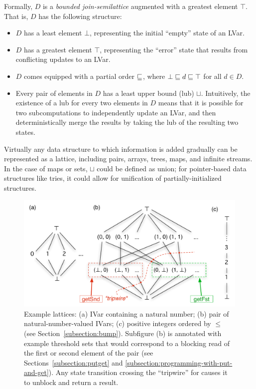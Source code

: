 Formally, $D$ is a \emph{bounded join-semilattice} augmented with a
greatest element $\top$.  That is, $D$ has the following structure:
\begin{itemize}
\item $D$ has a least element $\bot$, representing the initial
  ``empty'' state of an LVar.
\item $D$ has a greatest element $\top$, representing the ``error''
  state that results from conflicting updates to an LVar.
\item $D$ comes equipped with a partial order $\sqsubseteq$, where $\bot
  \sqsubseteq d \sqsubseteq \top$ for all $d \in D$.
\item Every pair of elements in $D$ has a least upper bound (lub)
  $\sqcup$.  Intuitively, the existence of a lub for every two
  elements in $D$ means that it is possible for two subcomputations to
  independently update an LVar, and then deterministically merge the
  results by taking the lub of the resulting two states.
\end{itemize}

\noindent Virtually any data structure to which information
is added gradually can be represented as a lattice, including pairs,
arrays, trees, maps, and infinite streams.  In the case of maps or
sets, $\sqcup$ could be defined as union; for pointer-based data
structures like tries, it could allow for unification of
partially-initialized structures.

\begin{figure}
\includegraphics[width=6in]{chapter2/figures/ExampleLattices2.pdf} 
  \caption{\footnotesize Example lattices: (a) IVar containing a
    natural number; (b) pair of natural-number-valued IVars; (c)
    positive integers ordered by $\leq$ (see
    Section~\ref{subsection:bump}).  Subfigure (b) is annotated with
    example threshold sets that would correspond to a blocking read of
    the first or second element of the pair (see
    Sections~\ref{subsection:putget}
    and \ref{subsection:programming-with-put-and-get}).  Any state
    transition crossing the ``tripwire'' for  causes
    it to unblock and return a result.}
    \label{f:lvars-example-lattices}
\end{figure}

